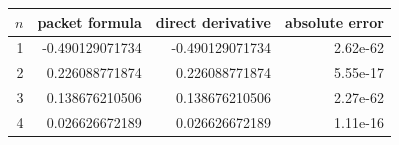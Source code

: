 \begin{tabular}{rrrr}
\toprule
$n$ & packet formula & direct derivative & absolute error\\
\midrule
1 & -0.490129071734 & -0.490129071734 & 2.62e-62\\
2 & 0.226088771874 & 0.226088771874 & 5.55e-17\\
3 & 0.138676210506 & 0.138676210506 & 2.27e-62\\
4 & 0.026626672189 & 0.026626672189 & 1.11e-16\\
\bottomrule
\end{tabular}